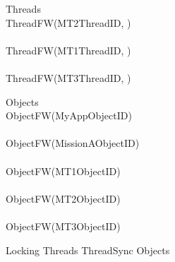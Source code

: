 %
\begin{circus}
\circprocess Threads \circdef  \\
\circblockopen
ThreadFW(MT2ThreadID, ) \\
\interleave \\
ThreadFW(MT1ThreadID, ) \\
\interleave \\
ThreadFW(MT3ThreadID, ) \\

\circblockclose
\end{circus}
%
%
\begin{circus}
\circprocess Objects \circdef \\
\circblockopen
ObjectFW(MyAppObjectID) \\
\interleave \\
ObjectFW(MissionAObjectID) \\
\interleave \\
ObjectFW(MT1ObjectID) \\
\interleave \\
ObjectFW(MT2ObjectID) \\
\interleave \\
ObjectFW(MT3ObjectID) \\

\circblockclose
\end{circus}
%
%
\begin{circus}
\circprocess Locking \circdef Threads \lpar ThreadSync \rpar Objects
\end{circus}
